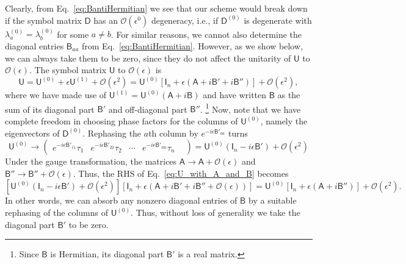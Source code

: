 Clearly, from Eq.~\eqref{eq:BantiHermitian} we see that our scheme would break down if the symbol matrix $\mathsf{D}$ has an $\mathcal{O}(\epsilon^{0})$ degeneracy, i.e., if $\mathsf{D}^{(0)}$ is degenerate with $\lambda^{(0)}_{a} = \lambda^{(0)}_{b}$ for some $a \neq b$.
For similar reasons, we cannot also determine the diagonal entries $\mathsf{B}_{aa}$ from Eq.~\eqref{eq:BantiHermitian}.
However, as we show below, we can always take them to be zero, since they do not affect the unitarity of $\mathsf{U}$ to $\mathcal{O}(\epsilon)$.
The symbol matrix $\mathsf{U}$ to $\mathcal{O}(\epsilon)$ is
%
\begin{equation}
  \mathsf{U} = \mathsf{U}^{(0)} + \epsilon \mathsf{U}^{(1)} + \mathcal{O}(\epsilon^{2}) = \mathsf{U}^{(0)}\left[\mathsf{I}_{n} + \epsilon\left(\mathsf{A} + i\mathsf{B}' + i\mathsf{B}'' \right)\right] + \mathcal{O}(\epsilon^{2}),
  \label{eq:U_with_A_and_B}
\end{equation}
%
where we have made use of $\mathsf{U}^{(1)} = \mathsf{U}^{(0)}(\mathsf{A} + i\mathsf{B})$ and have written $\mathsf{B}$ as the sum of its diagonal part $\mathsf{B}'$ and off-diagonal part $\mathsf{B}''$.%
\footnote{Since $\mathsf{B}$ is Hermitian, its diagonal part $\mathsf{B}'$ is a real matrix.}
Now, note that we have complete freedom in choosing phase factors for the columns of $\mathsf{U}^{(0)}$, namely the eigenvectors of $\mathsf{D}^{(0)}$.
Rephasing the $a$th column by $e^{-i\epsilon\mathsf{B}'_{aa}}$ turns
%
\begin{equation}
    \mathsf{U}^{(0)} \to
      \begin{pmatrix}
        e^{-i\epsilon\mathsf{B}'_{11}}\tau_{1} &
        e^{-i\epsilon\mathsf{B}'_{22}}\tau_{2} &
        \cdots &
        e^{-i\epsilon\mathsf{B}'_{nn}}\tau_{n} &
      \end{pmatrix}
      = \mathsf{U}^{(0)}(\mathsf{I}_{n} - i\epsilon\mathsf{B}') + \mathcal{O}(\epsilon^{2})
\end{equation}
%
Under the gauge transformation, the matrices $\mathsf{A} \to \mathsf{A} + \mathcal{O}(\epsilon)$ and $\mathsf{B}'' \to \mathsf{B}'' + \mathcal{O}(\epsilon)$.
Thus, the RHS of Eq.~\eqref{eq:U_with_A_and_B} becomes
%
\begin{equation}
  \left[\mathsf{U}^{(0)}(\mathsf{I}_{n} - i\epsilon\mathsf{B}') + \mathcal{O}(\epsilon^{2})\right]\left[\mathsf{I}_{n} + \epsilon\left(\mathsf{A} + i\mathsf{B}' + i\mathsf{B}'' + \mathcal{O}(\epsilon)\right)\right]
  =
  \mathsf{U}^{(0)}\left[\mathsf{I}_{n} + \epsilon\left(\mathsf{A} + i\mathsf{B}'' \right)\right] + \mathcal{O}(\epsilon^{2}).
\end{equation}
%
In other words, we can absorb any nonzero diagonal entries of $\mathsf{B}$ by a suitable rephasing of the columns of $\mathsf{U}^{(0)}$.
Thus, without loss of generality we take the diagonal part $\mathsf{B}'$ to be zero.

